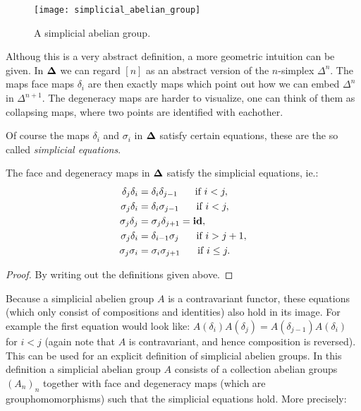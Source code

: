 \begin{figure}
	\label{fig:simplicial_abelian_group}
	\texttt{[image: simplicial\_abelian\_group]}
	\caption{A simplicial abelian group.}
\end{figure}

Althoug this is a very abstract definition, a more geometric intuition can be given. In $\mathbf{\Delta}$ we can regard $[n]$ as an abstract version of the $n$-simplex $\Delta^n$. The maps face maps $\delta_i$ are then exactly maps which point out how we can embed $\Delta^n$ in $\Delta^{n+1}$.  The degeneracy maps are harder to visualize, one can think of them as collapsing maps, where two points are identified with eachother.  

Of course the maps $\delta_i$ and $\sigma_i$ in $\mathbf{\Delta}$ satisfy certain equations, these are the so called \emph{simplicial equations}.

\begin{lemma}
	The face and degeneracy maps in $\mathbf{\Delta}$ satisfy the simplicial equations, ie.:
	\begin{align}
		\delta_j\delta_i &= \delta_i\delta_{j-1}  \hspace{0.5cm} \text{ if } i < j,\\
		\sigma_j\delta_i &= \delta_i\sigma_{j-1}  \hspace{0.5cm} \text{ if } i < j,\\
		\sigma_j\delta_j &= \sigma_j\delta_{j+1} = \mathbf{id},\\
		\sigma_j\delta_i &= \delta_{i-1}\sigma_j  \hspace{0.5cm} \text{ if } i > j+1,\\
		\sigma_j\sigma_i &= \sigma_i\sigma_{j+1}  \hspace{0.5cm} \text{ if } i \leq j.
	\end{align}
\end{lemma}
\begin{proof}
	By writing out the definitions given above.
\end{proof}

Because a simplicial abelien group $A$ is a contravariant functor, these equations (which only consist of compositions and identities) also hold in its image. For example the first equation would look like: $ A(\delta_i)A(\delta_j) = A(\delta_{j-1})A(\delta_i) $ for $ i < j$ (again note that $A$ is contravariant, and hence composition is reversed). This can be used for an explicit definition of simplicial abelien groups. In this definition a simplicial abelian group $A$ consists of a collection abelian groups $(A_n)_{n}$ together with face and degeneracy maps (which are grouphomomorphisms) such that the simplicial equations hold. More precisely:

